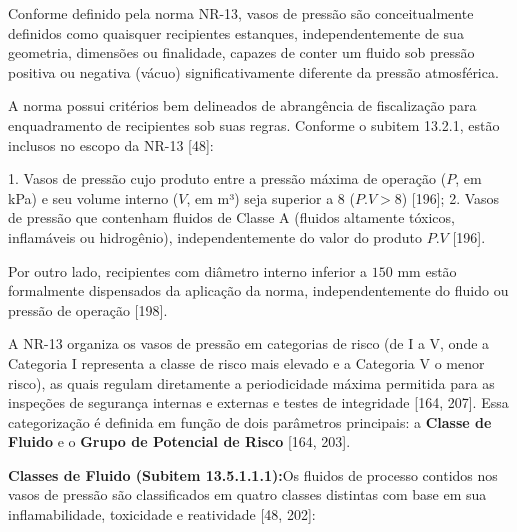 Conforme definido pela norma NR-13, vasos de pressão são conceitualmente definidos como quaisquer recipientes estanques, independentemente de sua geometria, dimensões ou finalidade, capazes de conter um fluido sob pressão positiva ou negativa (vácuo) significativamente diferente da pressão atmosférica.


A norma possui critérios bem delineados de abrangência de fiscalização para enquadramento de recipientes sob suas regras. Conforme o subitem 13.2.1, estão inclusos no escopo da NR-13 [48]:

1. Vasos de pressão cujo produto entre a pressão máxima de operação ($P$, em kPa) e seu volume interno ($V$, em m³) seja superior a 8 ($P.V > 8$) [196];
2. Vasos de pressão que contenham fluidos de Classe A (fluidos altamente tóxicos, inflamáveis ou hidrogênio), independentemente do valor do produto $P.V$ [196].

Por outro lado, recipientes com diâmetro interno inferior a $150$ mm estão formalmente dispensados da aplicação da norma, independentemente do fluido ou pressão de operação [198].

A NR-13 organiza os vasos de pressão em categorias de risco (de I a V, onde a Categoria I representa a classe de risco mais elevado e a Categoria V o menor risco), as quais regulam diretamente a periodicidade máxima permitida para as inspeções de segurança internas e externas e testes de integridade [164, 207]. Essa categorização é definida em função de dois parâmetros principais: a \textbf{Classe de Fluido} e o \textbf{Grupo de Potencial de Risco} [164, 203].

\textbf{Classes de Fluido (Subitem 13.5.1.1.1):}Os fluidos de processo contidos nos vasos de pressão são classificados em quatro classes distintas com base em sua inflamabilidade, toxicidade e reatividade [48, 202]:

